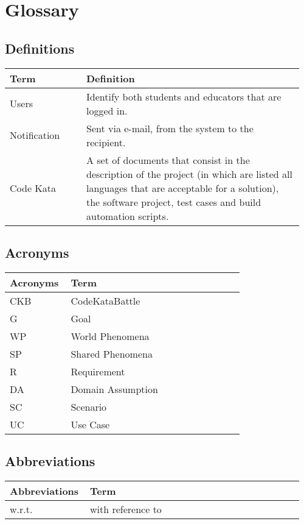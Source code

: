 \section{Glossary}
\subsection{Definitions}
\begin{center}
	\begin{tabular}{@{}p{0.25\linewidth} p{0.71\linewidth}@{}}
		\toprule
		\textbf{Term} & \textbf{Definition}\\
		\midrule
		Users & Identify both students and educators that are logged in. \\
            Notification & Sent via e-mail, from the system to the recipient. \\
            Code Kata & A set of documents that consist in the description of the project (in which are listed all languages that are acceptable for a solution), the software project, test cases and build automation scripts. \\
		\bottomrule
	\end{tabular}
\end{center}

\subsection{Acronyms}
\begin{center}
	\begin{tabular}{@{}p{0.25\linewidth} p{0.71\linewidth}@{}}
		\toprule
		\textbf{Acronyms} & \textbf{Term}\\
		\midrule
		CKB & CodeKataBattle\\
            G & Goal\\
		WP & World Phenomena\\
		SP & Shared Phenomena\\
            R & Requirement\\
            DA & Domain Assumption\\
            SC & Scenario\\
            UC & Use Case\\
		\bottomrule
	\end{tabular}
\end{center}

\subsection{Abbreviations}
\begin{center}
	\begin{tabular}{@{}p{0.25\linewidth} p{0.71\linewidth}@{}}
		\toprule
		\textbf{Abbreviations} & \textbf{Term}\\
		\midrule
		w.r.t. & with reference to\\
		\bottomrule
	\end{tabular}
\end{center}

